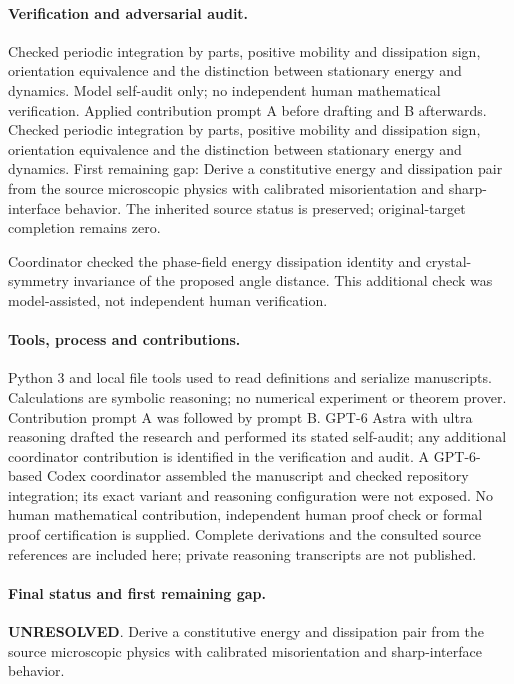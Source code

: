 \documentclass[11pt]{article}
\begin{document}
\paragraph{Verification and adversarial audit.}
Checked periodic integration by parts, positive mobility and dissipation sign, orientation equivalence and the distinction between stationary energy and dynamics. Model self-audit only; no independent human mathematical verification. Applied contribution prompt A before drafting and B afterwards. Checked periodic integration by parts, positive mobility and dissipation sign, orientation equivalence and the distinction between stationary energy and dynamics. First remaining gap: Derive a constitutive energy and dissipation pair from the source microscopic physics with calibrated misorientation and sharp-interface behavior. The inherited source status is preserved; original-target completion remains zero.

Coordinator checked the phase-field energy dissipation identity and crystal-symmetry invariance of the proposed angle distance. This additional check was model-assisted, not independent human verification.

\paragraph{Tools, process and contributions.}
Python 3 and local file tools used to read definitions and serialize manuscripts. Calculations are symbolic reasoning; no numerical experiment or theorem prover. Contribution prompt A was followed by prompt B. GPT-6 Astra with ultra reasoning drafted the research and performed its stated self-audit; any additional coordinator contribution is identified in the verification and audit. A GPT-6-based Codex coordinator assembled the manuscript and checked repository integration; its exact variant and reasoning configuration were not exposed. No human mathematical contribution, independent human proof check or formal proof certification is supplied. Complete derivations and the consulted source references are included here; private reasoning transcripts are not published.

\paragraph{Final status and first remaining gap.}
\textbf{UNRESOLVED}. Derive a constitutive energy and dissipation pair from the source microscopic physics with calibrated misorientation and sharp-interface behavior.
\end{document}
